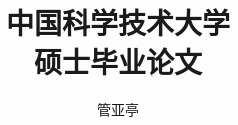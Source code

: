 ﻿\documentclass[master,euler,twoside,openright]{ustcthesis}
\title{中国科学技术大学\\硕士毕业论文}%
\author{管亚亭}
\begin{document}
  \maketitle

\frontmatter
\makeatletter
\ifustc@bachelor
	
	
	\tableofcontents

	\ustclot
	\ustclof
	\ustcloa
	
\else
	\tableofcontents

	\ustclot
	\ustclof
	\ustcloa
	
\fi
\makeatother

\mainmatter

  
  
  

\backmatter

  
  \nocite{*} %

  \begin{appendix}
    
  \end{appendix}

  \makeatletter
  \ifustc@bachelor\relax\else
    
  \fi
  \makeatother
\end{document}

